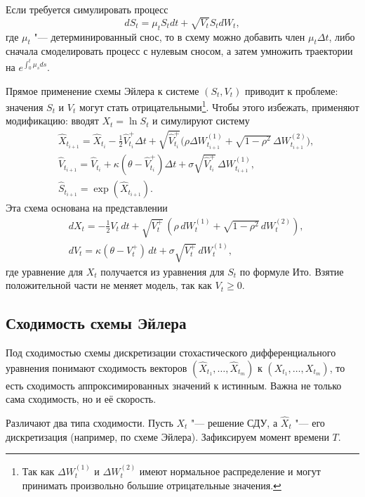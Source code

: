 \begin{remark}
Если требуется симулировать процесс
\[
d S_t = \mu_t S_t dt + \sqrt{V_t} S_t d W_t,
\]
где $\mu_t$ "--- детерминированный снос, то в схему можно добавить член $\mu_t \Delta t$, либо сначала смоделировать процесс с нулевым сносом, а затем умножить траектории на $e^{\int_0^t \mu_s ds}$.
\end{remark}

Прямое применение схемы Эйлера к системе $(S_t,V_t)$ приводит к проблеме: значения $S_t$ и $V_t$ могут стать отрицательными\footnote{Так как $\Delta W_t^{(1)}$ и $\Delta W_t^{(2)}$ имеют нормальное распределение и могут принимать произвольно большие отрицательные значения.}. 
Чтобы этого избежать, применяют модификацию: вводят $X_t=\ln S_t$ и симулируют систему
\begin{align*}
&\hat X_{t_{i+1}} = \hat X_{t_i} 
  - \frac12 \hat V_{t_i}^+ \Delta t 
  + \sqrt{\hat V_{t_i}^+} 
    \bigl(\rho \Delta W_{t_{i+1}}^{(1)} + \sqrt{1-\rho^2}\, \Delta W_{t_{i+1}}^{(2)}\bigr), \\
&\hat V_{t_{i+1}} = \hat V_{t_i} + \kappa(\theta - \hat V_{t_i}^+)\Delta t 
  + \sigma \sqrt{\hat V_{t_i}^+}\, \Delta W_{t_{i+1}}^{(1)},\\
&\hat S_{t_{i+1}} = \exp(\hat X_{t_{i+1}}).
\end{align*}
Эта схема основана на представлении
\begin{align*}
&d X_t = -\tfrac12 V_t\, dt + \sqrt{V_t^+}\, (\rho\, d W_t^{(1)} + \sqrt{1-\rho^2}\, d W_t^{(2)}),\\
&d V_t = \kappa(\theta - V_t^+)\, dt + \sigma \sqrt{V_t^+}\, d W_t^{(1)},
\end{align*}
где уравнение для $X_t$ получается из уравнения для $S_t$ по формуле Ито. Взятие положительной части не меняет модель, так как $V_t\ge0$.


\subsection{Сходимость схемы Эйлера}
\label{hdg:s:mc-convergence}
Под сходимостью схемы дискретизации стохастического дифференциального уравнения понимают сходимость векторов $(\hat X_{t_1},\dots,\hat X_{t_m})$ к $(X_{t_1},\dots,X_{t_m})$, то есть сходимость аппроксимированных значений к истинным. Важна не только сама сходимость, но и её скорость.

Различают два типа сходимости. Пусть $X_t$ "--- решение СДУ, а $\hat X_t$ "--- его дискретизация (например, по схеме Эйлера).
Зафиксируем момент времени $T$.

